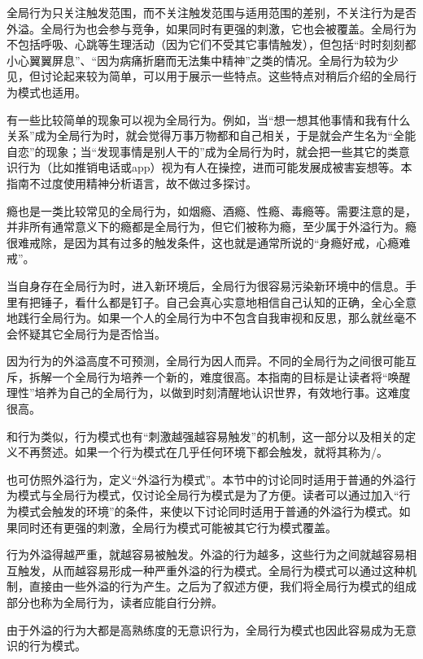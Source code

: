 \begin{explain}
全局行为只关注触发范围，而不关注触发范围与适用范围的差别，不关注行为是否外溢。全局行为也会参与竞争，如果同时有更强的刺激，它也会被覆盖。全局行为不包括呼吸、心跳等生理活动（因为它们不受其它事情触发），但包括“时时刻刻都小心翼翼屏息”、“因为病痛折磨而无法集中精神”之类的情况。全局行为较为少见，但讨论起来较为简单，可以用于展示一些特点。这些特点对稍后介绍的全局行为模式也适用。

有一些比较简单的现象可以视为全局行为。例如，当“想一想其他事情和我有什么关系”成为全局行为时，就会觉得万事万物都和自己相关，于是就会产生名为“全能自恋”的现象；当“发现事情是别人干的”成为全局行为时，就会把一些其它的类意识行为（比如推销电话或app）视为有人在操控，进而可能发展成被害妄想等。本指南不过度使用精神分析语言，故不做过多探讨。

瘾也是一类比较常见的全局行为，如烟瘾、酒瘾、性瘾、毒瘾等。需要注意的是，并非所有通常意义下的瘾都是全局行为，但它们被称为瘾，至少属于外溢行为。瘾很难戒除，是因为其有过多的触发条件，这也就是通常所说的“身瘾好戒，心瘾难戒”。

当自身存在全局行为时，进入新环境后，全局行为很容易污染新环境中的信息。手里有把锤子，看什么都是钉子。自己会真心实意地相信自己认知的正确，全心全意地践行全局行为。如果一个人的全局行为中不包含自我审视和反思，那么就丝毫不会怀疑其它全局行为是否恰当。

因为行为的外溢高度不可预测，全局行为因人而异。不同的全局行为之间很可能互斥，拆解一个全局行为培养一个新的，难度很高。本指南的目标是让读者将“唤醒理性”培养为自己的全局行为，以做到时刻清醒地认识世界，有效地行事。这难度很高。
\end{explain}
和行为类似，行为模式也有“刺激越强越容易触发”的机制，这一部分以及相关的定义不再赘述。如果一个行为模式在几乎任何环境下都会触发，就将其称为/。
\begin{explain}
也可仿照外溢行为，定义“外溢行为模式”。本节中的讨论同时适用于普通的外溢行为模式与全局行为模式，仅讨论全局行为模式是为了方便。读者可以通过加入“行为模式会触发的环境”的条件，来使以下讨论同时适用于普通的外溢行为模式。如果同时还有更强的刺激，全局行为模式可能被其它行为模式覆盖。

行为外溢得越严重，就越容易被触发。外溢的行为越多，这些行为之间就越容易相互触发，从而越容易形成一种严重外溢的行为模式。全局行为模式可以通过这种机制，直接由一些外溢的行为产生。之后为了叙述方便，我们将全局行为模式的组成部分也称为全局行为，读者应能自行分辨。

由于外溢的行为大都是高熟练度的无意识行为，全局行为模式也因此容易成为无意识的行为模式。
\end{explain}
